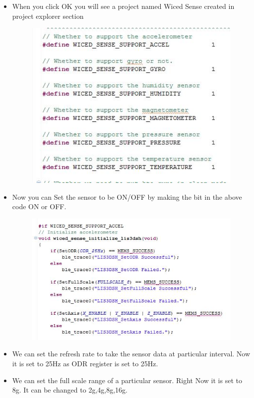 \documentclass[11pt,a4paper]{article}
\begin{document}
\begin{itemize}
	\item When you click OK you will see a project named Wiced Sense created in project explorer section
		
    \newpage
	 \begin{figure}[h]
    \centering
	\includegraphics[scale=0.6]{support.JPG}
	\end{figure}
	\item Now you can Set the sensor to be ON/OFF by making the bit in the above code ON or OFF.
	
	 \begin{figure}[h]
    \centering
	\includegraphics[scale=0.6]{wiced_accel.JPG}
	\end{figure}
	
	\item We can set the refresh rate to take the sensor data at particular interval. Now it is set to 25Hz as ODR register is set to 25Hz.
	\item We can set the full scale range of a particular sensor. Right Now it is set to 8g. It can be changed to 2g,4g,8g,16g.


\end{itemize}
\end{document}

